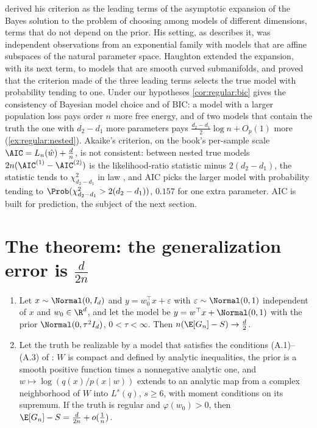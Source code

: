 \begin{refsection}
\Textcite{Schwarz1978} derived his criterion as the leading terms of the asymptotic expansion of the Bayes solution to the problem of choosing among models of different dimensions, terms that do not depend on the prior. His setting, as \textcite{Haughton1988} describes it, was independent observations from an exponential family with models that are affine subspaces of the natural parameter space. Haughton extended the expansion, with its next term, to models that are smooth curved submanifolds, and proved that the criterion made of the three leading terms selects the true model with probability tending to one. Under our hypotheses \cref{cor:regular:bic} gives the consistency of Bayesian model choice and of BIC: a model with a larger population loss pays order $n$ more free energy, and of two models that contain the truth the one with $d_2-d_1$ more parameters pays $\frac{d_2-d_1}2\log n+O_p(1)$ more (\cref{ex:regular:nested}). Akaike's criterion, on the book's per-sample scale $\AIC=L_n(\hat w)+\frac dn$, is not consistent: between nested true models $2n(\AIC^{(1)}-\AIC^{(2)})$ is the likelihood-ratio statistic minus $2(d_2-d_1)$, the statistic tends to $\chi^2_{d_2-d_1}$ in law \parencite{Wilks1938}, and AIC picks the larger model with probability tending to $\Prob(\chi^2_{d_2-d_1}>2(d_2-d_1))$, $0.157$ for one extra parameter. AIC is built for prediction, the subject of the next section.

\section{The theorem: the generalization error is \texorpdfstring{$\frac d{2n}$}{d/2n}}\label{sec:regular:aic}

\begin{theorem}\label{thm:regular:aic}
\begin{enumerate}
\item Let $x\sim\Normal(0,I_d)$ and $y=w_0^\top x+\varepsilon$ with $\varepsilon\sim\Normal(0,1)$ independent of $x$ and $w_0\in\R^d$, and let the model be $y=w^\top x+\Normal(0,1)$ with the prior $\Normal(0,\tau^2I_d)$, $0<\tau<\infty$. Then $n(\E[G_n]-S)\to\frac d2$.
\item Let the truth be realizable by a model that satisfies the conditions (A.1)--(A.3) of \textcite{Watanabe2010a}: $W$ is compact and defined by analytic inequalities, the prior is a smooth positive function times a nonnegative analytic one, and $w\mapsto\log(q(x)/p(x\mid w))$ extends to an analytic map from a complex neighborhood of $W$ into $L^s(q)$, $s\ge6$, with moment conditions on its supremum. If the truth is regular and $\varphi(w_0)>0$, then $\E[G_n]-S=\frac d{2n}+o(\frac1n)$.
\end{enumerate}
\end{theorem}


\end{refsection}
